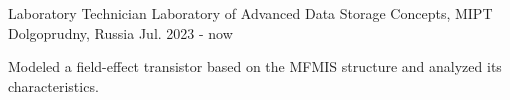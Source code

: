 
\begin{cventries}

  \cventry
  {Laboratory Technician}
  {Laboratory of Advanced Data Storage Concepts, MIPT}
  {Dolgoprudny, Russia}
  {Jul. 2023 - now}
  {
    \begin{cvitems}
      \item {Modeled a field-effect transistor based on the MFMIS structure and analyzed its characteristics.}
    \end{cvitems}
  }

\end{cventries}
